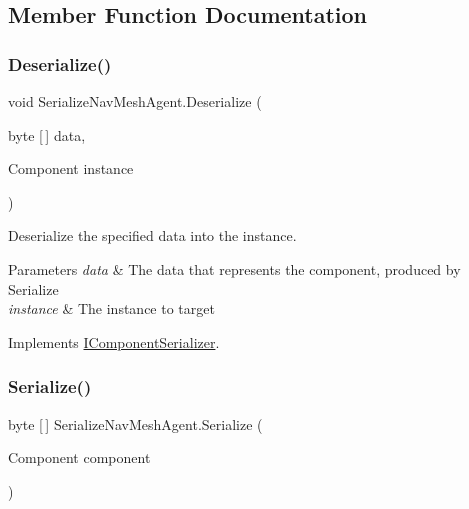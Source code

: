 \subsection{Member Function Documentation}
\mbox{\label{class_serialize_nav_mesh_agent_ad5a28c80e751f4727a1a4b83c06b5428}} 
\subsubsection{\texorpdfstring{Deserialize()}{Deserialize()}}
{\footnotesize\ttfamily void Serialize\+Nav\+Mesh\+Agent.\+Deserialize (\begin{DoxyParamCaption}\item[{byte \mbox{[}$\,$\mbox{]}}]{data,  }\item[{Component}]{instance }\end{DoxyParamCaption})\hspace{0.3cm}{\ttfamily [inline]}}



Deserialize the specified data into the instance. 


\begin{DoxyParams}{Parameters}
{\em data} & The data that represents the component, produced by Serialize \\
\hline
{\em instance} & The instance to target \\
\hline
\end{DoxyParams}


Implements \hyperlink{interface_i_component_serializer_a4cc366a5c78b33d47a90c209d8fed883}{I\+Component\+Serializer}.

\mbox{\label{class_serialize_nav_mesh_agent_a74cea446ba02a0814a3c215c27fa81d8}} 
\subsubsection{\texorpdfstring{Serialize()}{Serialize()}}
{\footnotesize\ttfamily byte \mbox{[}$\,$\mbox{]} Serialize\+Nav\+Mesh\+Agent.\+Serialize (\begin{DoxyParamCaption}\item[{Component}]{component }\end{DoxyParamCaption})\hspace{0.3cm}{\ttfamily [inline]}}



